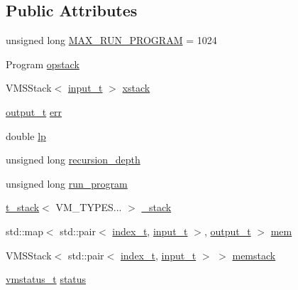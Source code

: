 \subsection*{Public Attributes}
\begin{DoxyCompactItemize}
\item 
unsigned long \hyperlink{class_virtual_machine_state_a8ad0bb79907ef1babd0a7b3a9cc88d46}{M\+A\+X\+\_\+\+R\+U\+N\+\_\+\+P\+R\+O\+G\+R\+AM} = 1024
\item 
Program \hyperlink{class_virtual_machine_state_af154a184be7061c9fc1ee7fa875cffa0}{opstack}
\item 
V\+M\+S\+Stack$<$ \hyperlink{class_virtual_machine_state_a04c5592dddd5b9ffdae5a509d73127dd}{input\+\_\+t} $>$ \hyperlink{class_virtual_machine_state_aded245a367f3caca62faf7264feaff41}{xstack}
\item 
\hyperlink{class_virtual_machine_state_a005a025f97d9505b00e7f9f0e99002bb}{output\+\_\+t} \hyperlink{class_virtual_machine_state_aa3eaa4b1432d1604b86039d2ff0faae1}{err}
\item 
double \hyperlink{class_virtual_machine_state_a5937b2c3afdfe35b9bba71dbdd83d5bd}{lp}
\item 
unsigned long \hyperlink{class_virtual_machine_state_aa35593f67d1ea4e838fec8e7a8d33897}{recursion\+\_\+depth}
\item 
unsigned long \hyperlink{class_virtual_machine_state_afc2691c3bd3c7c3feba0708c2929ffe2}{run\+\_\+program}
\item 
\hyperlink{struct_virtual_machine_state_1_1t__stack}{t\+\_\+stack}$<$ V\+M\+\_\+\+T\+Y\+P\+E\+S... $>$ \hyperlink{class_virtual_machine_state_a55e2a8e32597a15740e9e38ae539200c}{\+\_\+stack}
\item 
std\+::map$<$ std\+::pair$<$ \hyperlink{class_virtual_machine_state_a95ba2f54f65b778c8a012ea3e7a0ee50}{index\+\_\+t}, \hyperlink{class_virtual_machine_state_a04c5592dddd5b9ffdae5a509d73127dd}{input\+\_\+t} $>$, \hyperlink{class_virtual_machine_state_a005a025f97d9505b00e7f9f0e99002bb}{output\+\_\+t} $>$ \hyperlink{class_virtual_machine_state_a8f36d4040b98a1e85fb7edf61e6085c9}{mem}
\item 
V\+M\+S\+Stack$<$ std\+::pair$<$ \hyperlink{class_virtual_machine_state_a95ba2f54f65b778c8a012ea3e7a0ee50}{index\+\_\+t}, \hyperlink{class_virtual_machine_state_a04c5592dddd5b9ffdae5a509d73127dd}{input\+\_\+t} $>$ $>$ \hyperlink{class_virtual_machine_state_a27df19177ca8ede5d88bf51cff785c00}{memstack}
\item 
\hyperlink{_instruction_8h_a6202215407ab29590bb936ca2996cf64}{vmstatus\+\_\+t} \hyperlink{class_virtual_machine_state_a6e561a217081654b4187620953e86fff}{status}
\end{DoxyCompactItemize}

